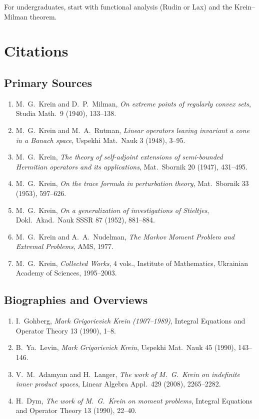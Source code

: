 For undergraduates, start with functional analysis (Rudin or Lax) and the Krein--Milman theorem.

\section{Citations}\subsection*{Primary Sources}
\begin{enumerate}
    \item M.\ G.\ Krein and D.\ P.\ Milman, \textit{On extreme points of regularly convex sets}, Studia Math.\ 9 (1940), 133--138.
    \item M.\ G.\ Krein and M.\ A.\ Rutman, \textit{Linear operators leaving invariant a cone in a Banach space}, Uspekhi Mat.\ Nauk 3 (1948), 3--95.
    \item M.\ G.\ Krein, \textit{The theory of self-adjoint extensions of semi-bounded Hermitian operators and its applications}, Mat.\ Sbornik 20 (1947), 431--495.
    \item M.\ G.\ Krein, \textit{On the trace formula in perturbation theory}, Mat.\ Sbornik 33 (1953), 597--626.
    \item M.\ G.\ Krein, \textit{On a generalization of investigations of Stieltjes}, Dokl.\ Akad.\ Nauk SSSR 87 (1952), 881--884.
    \item M.\ G.\ Krein and A.\ A.\ Nudelman, \textit{The Markov Moment Problem and Extremal Problems}, AMS, 1977.
    \item M.\ G.\ Krein, \textit{Collected Works}, 4 vols., Institute of Mathematics, Ukrainian Academy of Sciences, 1995--2003.
\end{enumerate}

\subsection*{Biographies and Overviews}
\begin{enumerate}
    \item I.\ Gohberg, \textit{Mark Grigorievich Krein (1907--1989)}, Integral Equations and Operator Theory 13 (1990), 1--8.
    \item B.\ Ya.\ Levin, \textit{Mark Grigorievich Krein}, Uspekhi Mat.\ Nauk 45 (1990), 143--146.
    \item V.\ M.\ Adamyan and H.\ Langer, \textit{The work of M.\ G.\ Krein on indefinite inner product spaces}, Linear Algebra Appl.\ 429 (2008), 2265--2282.
    \item H.\ Dym, \textit{The work of M.\ G.\ Krein on moment problems}, Integral Equations and Operator Theory 13 (1990), 22--40.
\end{enumerate}

